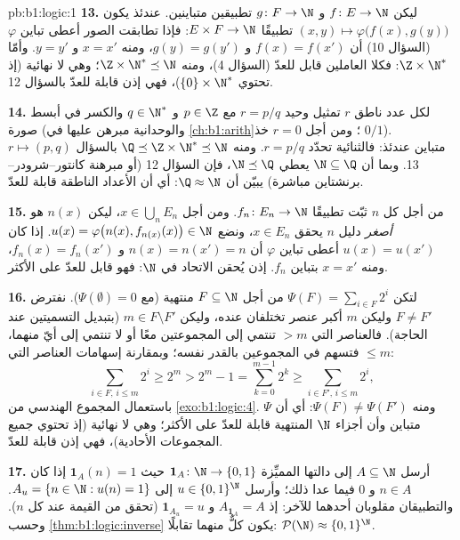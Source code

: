 \begin{solution}{pb:b1:logic:1}
\textbf{13.} ليكن $f \colon E \to \N$ و $g \colon F \to \N$
تطبيقين متباينين. عندئذ يكون $(x, y) \mapsto \varphi\bigl(f(x), g(y)\bigr)$ تطبيقًا
 $E \times F \to \N$: فإذا تطابقت الصور أعطى تباين
$\varphi$ (السؤال 10) أن $f(x) = f(x')$ و $g(y) = g(y')$،
ومنه $x = x'$ و $y = y'$. وأمّا $\Z \times \N^*$: فكلا العاملين
قابل للعدّ (السؤال 4)، ومنه $\Z \times \N^* \preceq \N$؛ وهي
لا نهائية (إذ تحتوي $\{0\} \times \N^*$)، فهي إذن قابلة للعدّ
بالسؤال 12.

\textbf{14.} لكل عدد ناطق $r$ تمثيل وحيد $r =
p/q$ مع $p \in \Z$ و $q \in \N^*$ والكسر في أبسط صورة
(والوحدانية مبرهن عليها في \cref{ch:b1:arith}؛ ومن أجل $r = 0$ خذ
$0/1$).  $r \mapsto (p, q)$ متباين عندئذ: فالثنائية
تحدّد $r = p/q$. ومنه $\Q \preceq \Z \times \N^* \preceq \N$
بالسؤال 13. وبما أن $\N \subseteq \Q$ يعطي $\N \preceq \Q$، فإن
السؤال 12 (أو مبرهنة كانتور--شرودر--برنشتاين مباشرة) يبيّن أن $\Q
\approx \N$: أي أن الأعداد الناطقة قابلة للعدّ.

\textbf{15.} من أجل كل $n$ ثبّت تطبيقًا  $f_n \colon E_n \to \N$.
ومن أجل $x \in \bigcup_n E_n$، ليكن $n(x)$ هو \emph{أصغر} دليل $n$
يحقق $x \in E_n$، ونضع $u(x) = \varphi\bigl(n(x), f_{n(x)}(x)\bigr)
\in \N$. إذا كان $u(x) = u(x')$ أعطى تباين $\varphi$ أن $n(x) =
n(x') = n$ و $f_n(x) = f_n(x')$، ومنه $x = x'$ بتباين
$f_n$. إذن يُحقن الاتحاد في $\N$: فهو قابل للعدّ على الأكثر.

\textbf{16.} لتكن $\Psi(F) = \sum_{i \in F} 2^i$ من أجل $F \subseteq \N$
منتهية (مع $\Psi(\emptyset) = 0$). نفترض $F \neq F'$ وليكن $m$
أكبر عنصر تختلفان عنده، وليكن $m \in F \setminus
F'$ (بتبديل التسميتين عند الحاجة). فالعناصر التي $> m$ تنتمي إلى
المجموعتين معًا أو لا تنتمي إلى أيّ منهما، فتسهم في المجموعين
بالقدر نفسه؛ وبمقارنة إسهامات العناصر التي $\leq m$:
\[
\sum_{i \in F,\, i \leq m} 2^i \geq 2^m
> 2^m - 1 = \sum_{k=0}^{m-1} 2^k
\geq \sum_{i \in F',\, i \leq m} 2^i ,
\]
باستعمال المجموع الهندسي من \cref{exo:b1:logic:4}. ومنه $\Psi(F)
\neq \Psi(F')$: أي أن $\Psi$ متباين وأن  أجزاء $\N$
المنتهية قابلة للعدّ على الأكثر؛ وهي لا نهائية (إذ تحتوي جميع
المجموعات الأحادية)، فهي إذن قابلة للعدّ.

\textbf{17.} أرسل $A \subseteq \N$ إلى دالتها المميِّزة $\mathbf 1_A
\colon \N \to \{0,1\}$ حيث $\mathbf 1_A(n) = 1$ إذا كان $n \in A$ و $0$
فيما عدا ذلك؛ وأرسل $u \in \{0,1\}^{\N}$ إلى $A_u = \{n \in \N : u(n) =
1\}$. والتطبيقان مقلوبان أحدهما للآخر: إذ $A_{\mathbf 1_A} = A$ و
$\mathbf 1_{A_u} = u$ (تحقق من القيمة عند كل $n$). وحسب
\cref{thm:b1:logic:inverse} يكون كلٌّ منهما تقابلًا: $\mathcal{P}(\N)
\approx \{0,1\}^{\N}$.


\end{solution}
